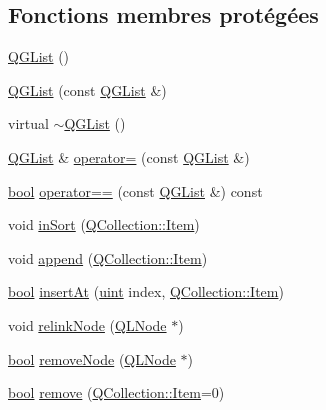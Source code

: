 \subsection*{Fonctions membres protégées}
\begin{DoxyCompactItemize}
\item 
\hyperlink{class_q_g_list_a560fcb7ba1c21dd186c24458609b0afd}{Q\+G\+List} ()
\item 
\hyperlink{class_q_g_list_a5215004b76329c79a02ae01134acc946}{Q\+G\+List} (const \hyperlink{class_q_g_list}{Q\+G\+List} \&)
\item 
virtual \hyperlink{class_q_g_list_a0e89dc6ca628d0c305160a7f4a128fb5}{$\sim$\+Q\+G\+List} ()
\item 
\hyperlink{class_q_g_list}{Q\+G\+List} \& \hyperlink{class_q_g_list_a4703bb593e7ccd0936cef358ded96080}{operator=} (const \hyperlink{class_q_g_list}{Q\+G\+List} \&)
\item 
\hyperlink{qglobal_8h_a1062901a7428fdd9c7f180f5e01ea056}{bool} \hyperlink{class_q_g_list_ada78f9b14ca5f7a6a9171985cfc68ad5}{operator==} (const \hyperlink{class_q_g_list}{Q\+G\+List} \&) const 
\item 
void \hyperlink{class_q_g_list_a1613bab545e4e7d3e5c68de22e024128}{in\+Sort} (\hyperlink{class_q_collection_ac6f3ddbf999e31fb797927f71ae6b5d7}{Q\+Collection\+::\+Item})
\item 
void \hyperlink{class_q_g_list_a3fc7fb06dc2347dc27fdeea23e8abffc}{append} (\hyperlink{class_q_collection_ac6f3ddbf999e31fb797927f71ae6b5d7}{Q\+Collection\+::\+Item})
\item 
\hyperlink{qglobal_8h_a1062901a7428fdd9c7f180f5e01ea056}{bool} \hyperlink{class_q_g_list_a2404fe31bb1b1e57fb530e3ad5059b0e}{insert\+At} (\hyperlink{qglobal_8h_a4d3943ddea65db7163a58e6c7e8df95a}{uint} index, \hyperlink{class_q_collection_ac6f3ddbf999e31fb797927f71ae6b5d7}{Q\+Collection\+::\+Item})
\item 
void \hyperlink{class_q_g_list_a8962d8770498694d0805a5003f160776}{relink\+Node} (\hyperlink{class_q_l_node}{Q\+L\+Node} $\ast$)
\item 
\hyperlink{qglobal_8h_a1062901a7428fdd9c7f180f5e01ea056}{bool} \hyperlink{class_q_g_list_af146dd013966d2571f182dc9f1eca10b}{remove\+Node} (\hyperlink{class_q_l_node}{Q\+L\+Node} $\ast$)
\item 
\hyperlink{qglobal_8h_a1062901a7428fdd9c7f180f5e01ea056}{bool} \hyperlink{class_q_g_list_a2110da1b8f8b1a3ab1d9063deb31055e}{remove} (\hyperlink{class_q_collection_ac6f3ddbf999e31fb797927f71ae6b5d7}{Q\+Collection\+::\+Item}=0)

\end{DoxyCompactItemize}
